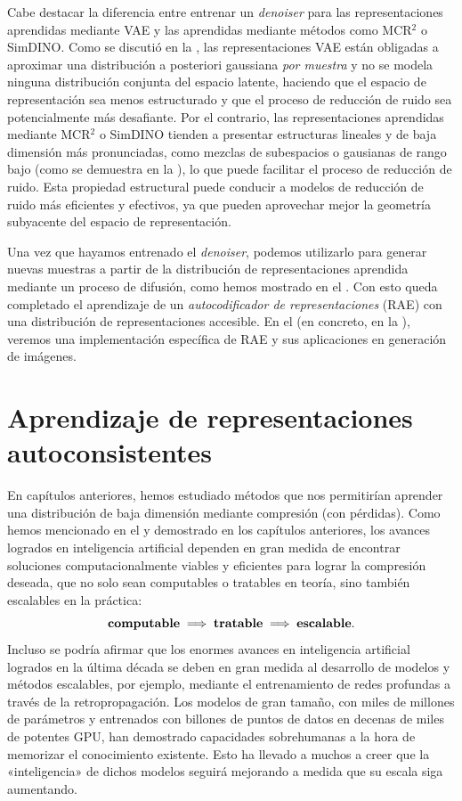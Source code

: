 \documentclass[../../book-main_es.tex]{subfiles}
\begin{document}
Cabe destacar la diferencia entre entrenar un \textit{denoiser} para las
representaciones aprendidas mediante VAE y las aprendidas mediante métodos como MCR$^2$ o
SimDINO. Como se discutió en la , las representaciones VAE están
obligadas a aproximar una distribución a posteriori gaussiana \textit{por muestra} y
no se modela ninguna distribución conjunta del espacio latente, haciendo que el
espacio de representación sea menos estructurado y que el proceso de
reducción de ruido sea potencialmente más desafiante. Por el contrario, las representaciones aprendidas
mediante MCR$^2$ o SimDINO tienden a presentar estructuras lineales y
de baja dimensión más pronunciadas, como mezclas de subespacios o gausianas de rango bajo
(como se demuestra en la ), lo que puede
facilitar el proceso de reducción de ruido. Esta propiedad estructural puede conducir
a modelos de reducción de ruido más eficientes y efectivos, ya que pueden aprovechar mejor
la geometría subyacente del espacio de representación.

Una vez que hayamos entrenado el \textit{denoiser}, podemos utilizarlo para generar nuevas muestras a partir de
la distribución de representaciones aprendida mediante un proceso de difusión, como hemos
mostrado en el . Con esto queda completado el aprendizaje de
un \textit{autocodificador de representaciones} (RAE) con una distribución de representaciones accesible.
En el  (en concreto, en la ), veremos una implementación específica de
RAE y sus aplicaciones en generación de imágenes.

\section{Aprendizaje de representaciones autoconsistentes}
\label{sec:self-consistency}

En capítulos anteriores, hemos estudiado métodos que nos permitirían
aprender una distribución de baja dimensión mediante compresión (con pérdidas). Como
hemos mencionado en el  y demostrado en los capítulos anteriores,
los avances logrados en inteligencia artificial dependen en gran medida de
encontrar soluciones computacionalmente viables y eficientes para lograr
la compresión deseada, que no solo sean computables o tratables en teoría,
sino también escalables en la práctica:
\begin{equation}
    \mbox{\textbf{computable}} \;
    \Longrightarrow \; \mbox{\textbf{tratable}} \; \Longrightarrow \;
    \mbox{\textbf{escalable}}.
\end{equation}
Incluso se podría afirmar que los enormes avances en inteligencia artificial
logrados en la última década se deben en gran medida al
desarrollo de modelos y métodos escalables, por ejemplo, mediante el entrenamiento de redes profundas
a través de la retropropagación. Los modelos de gran tamaño, con miles de millones de
parámetros y entrenados con billones de puntos de datos en decenas de miles
de potentes GPU, han demostrado capacidades sobrehumanas a la hora de
memorizar el conocimiento existente. Esto ha llevado a muchos a creer que la
«inteligencia» de dichos modelos seguirá mejorando a medida que su
escala siga aumentando.
\end{document}
